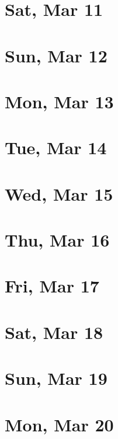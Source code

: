 	\section{Sat, Mar 11}
		
	\section{Sun, Mar 12}
		
	\section{Mon, Mar 13}
		
	\section{Tue, Mar 14}
		
	\section{Wed, Mar 15}
		
	\section{Thu, Mar 16}
		
	\section{Fri, Mar 17}
		
	\section{Sat, Mar 18}
		
	\section{Sun, Mar 19}
		
	\section{Mon, Mar 20}
		
